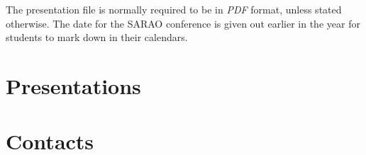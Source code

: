 \documentclass[12pt]{article}
\begin{document}
        The presentation file is normally required to be in \emph{PDF} format, unless stated otherwise. The date for the SARAO conference is given out earlier in the year for students to mark down in their calendars.

\section{Presentations}\label{sec:presentations}

\section{Contacts}\label{sec:contact}
\end{document}
